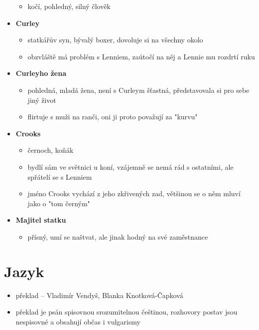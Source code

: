 \documentclass[10pt,a4paper]{article}
\begin{document}
\begin{itemize}
\begin{itemize}
	\item kočí, pohledný, silný člověk
	\end{itemize}
\item \textbf{Curley}
	\begin{itemize}
	\item statkářův syn, bývalý boxer, dovoluje si na všechny okolo
	\item obzvláště má problém s Lenniem, zaútočí na něj a Lennie mu rozdrtí ruku
	\end{itemize}
\item \textbf{Curleyho žena}
	\begin{itemize}
	\item pohledná, mladá žena, není s Curleym šťastná, představovala si pro sebe jiný život
	\item flirtuje s muži na ranči, oni ji proto považují za "kurvu"
	\end{itemize}
\item \textbf{Crooks}
	\begin{itemize}
	\item černoch, koňák
	\item bydlí sám ve světnici u koní, vzájemně se nemá rád s ostatními, ale spřátelí se s Lenniem
	\item jméno Crooks vychází z jeho zkřivených zad, většinou se o něm mluví jako o "tom černým"
	\end{itemize}
\item \textbf{Majitel statku}
	\begin{itemize}
	\item přísný, umí se naštvat, ale jinak hodný na své zaměstnance
	\end{itemize}

\end{itemize}
\section*{Jazyk}
\begin{itemize}
\item překlad -- Vladimír Vendyš, Blanka Knotková-Čapková
\item překlad je psán spisovnou srozumitelnou češtinou, rozhovory postav jsou nespisovné a obsahují občas i vulgarismy
\end{itemize}
\end{document}
